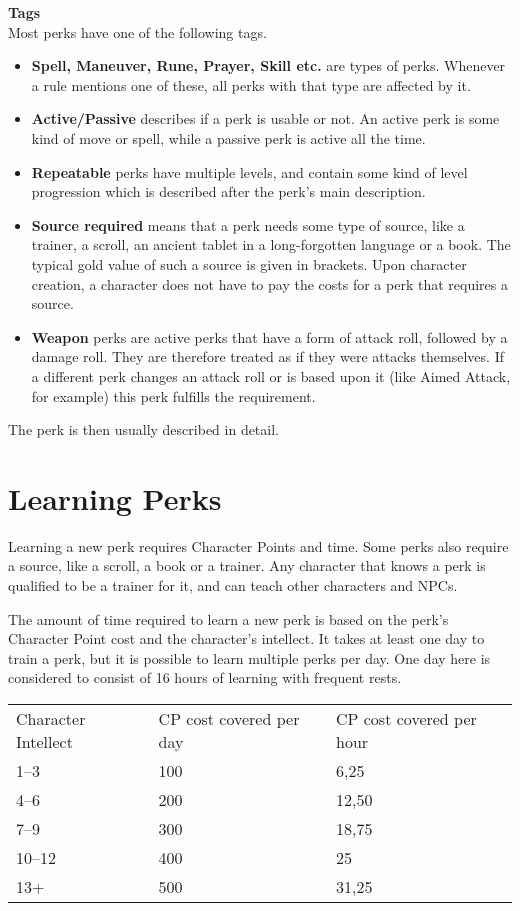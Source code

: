 \textbf{Tags}\\
Most perks have one of the following tags.\\
\begin{itemize}
	\item \textbf{Spell, Maneuver, Rune, Prayer, Skill etc.} are types of perks.
	 Whenever a rule mentions one of these, all perks with that type are affected by it.\\
	\item \textbf{Active/Passive} describes if a perk is usable or not.
	An active perk is some kind of move or spell, while a passive perk is active all the time.\\
	\item \textbf{Repeatable} perks have multiple levels, and contain some kind of level progression which is described after the perk's main description.\\
	\item \textbf{Source required} means that a perk needs some type of source, like a trainer, a scroll, an ancient tablet in a long-forgotten language or a book.
	The typical gold value of such a source is given in brackets.
	Upon character creation, a character does not have to pay the costs for a perk that requires a source.\\
	\item \textbf{Weapon} perks are active perks that have a form of attack roll, followed by a damage roll.
	They are therefore treated as if they were attacks themselves.
	If a different perk changes an attack roll or is based upon it (like Aimed Attack, for example) this perk fulfills the requirement.\\
\end{itemize}

The perk is then usually described in detail.

\section{Learning Perks}
Learning a new perk requires Character Points and time.
Some perks also require a source, like a scroll, a book or a trainer.
Any character that knows a perk is qualified to be a trainer for it, and can teach other characters and NPCs.

The amount of time required to learn a new perk is based on the perk's Character Point cost and the character's intellect.
It takes at least one day to train a perk, but it is possible to learn multiple perks per day.
One day here is considered to consist of 16 hours of learning with frequent rests.\\

\begin{tabular}{l | l | l}
	Character Intellect & CP cost covered per day & CP cost covered per hour\\
	1--3 & 100 & 6,25\\
	4--6 & 200 & 12,50\\
	7--9 & 300 & 18,75\\
	10--12 & 400 & 25\\
	13+ & 500 & 31,25
\end{tabular}